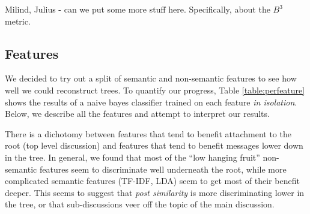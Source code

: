 \documentclass[10pt]{article}
\begin{document}
Milind, Julius - can we put some more stuff here. 
Specifically, about the $B^3$ metric.

\subsection{Features}
\label{sec:features}
We decided to try out a split of semantic and non-semantic features to see how 
well we could reconstruct trees. To quantify our progress, Table
\ref{table:perfeature} shows the results of a naive bayes classifier trained on
each feature \textit{in isolation}. Below, we describe all the features and
attempt to interpret our results. 

There is a dichotomy between features that tend to benefit attachment to the root (top
level discussion) and features that tend to benefit messages lower down in the
tree. In general, we found that most of the ``low hanging fruit'' non-semantic
features seem to discriminate well underneath the root, while more complicated
semantic features (TF-IDF, LDA) seem to get most of their benefit deeper. This
seems to suggest that \textit{post similarity} is more discriminating lower in
the tree, or that sub-discussions veer off the topic of the main discussion. 
\end{document}
